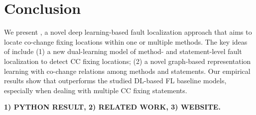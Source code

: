 \section{Conclusion}

We present {\tool}, a novel deep learning-based fault localization
approach that aims to locate co-change fixing locations within one or
multiple methods. The key ideas of {\tool} include (1) a new
dual-learning model of method- and statement-level fault localization
to detect CC fixing locations; (2) a novel graph-based representation
learning with co-change relations among methods and statements. Our
empirical results show that {\tool} outperforms the studied DL-based
FL baseline models, especially when dealing with multiple CC fixing
statements.

{\bf 1) PYTHON RESULT, 2) RELATED WORK, 3) WEBSITE.}

